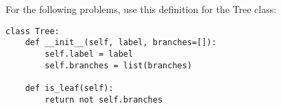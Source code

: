 For the following problems, use this definition for the Tree class:
\begin{lstlisting}
class Tree:
    def __init__(self, label, branches=[]):
        self.label = label
        self.branches = list(branches)

    def is_leaf(self):
        return not self.branches

\end{lstlisting}

